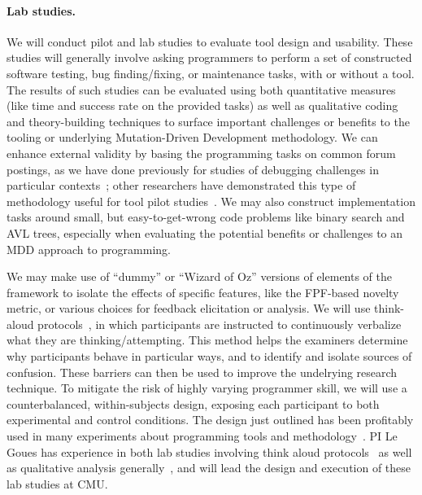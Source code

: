 \paragraph{Lab studies.}  
We will conduct pilot and lab studies to evaluate tool design
and usability. 
These studies will generally involve asking programmers to perform a set of
constructed software testing, bug finding/fixing, or maintenance tasks, with or
without a tool.  The results of such studies can be evaluated using both
quantitative measures (like time and success rate on the provided tasks) as well
as qualitative coding~\cite{something} and theory-building techniques to surface
important challenges or benefits to the tooling or underlying Mutation-Driven
Development methodology.  We can enhance external validity by basing the
programming tasks on common forum postings, as we have done previously for
studies of debugging challenges in particular
contexts~\cite{frameworkDebugging}; other researchers have demonstrated this
type of methodology useful for tool pilot studies~\cite{sunshineDocumentation}.
We may also construct implementation tasks around small, but easy-to-get-wrong
code problems like binary search and AVL trees, especially when evaluating the
potential benefits or challenges to an MDD approach to programming.  

We may make use of ``dummy'' or ``Wizard of Oz'' versions of elements of the
framework to isolate the effects of specific features, like the FPF-based
novelty metric, or various choices for feedback elicitation or analysis. 
We will use
think-aloud protocols~\cite{thinkaloud}, in which participants are instructed to
continuously verbalize what they are thinking/attempting. This method helps the
examiners determine why participants behave in particular ways, and to identify
and isolate sources of confusion.  These barriers can then be used to improve
the undelrying research technique.  To mitigate the risk of highly varying
programmer skill, we will use a counterbalanced, within-subjects design,
exposing each participant to both experimental and control conditions.  The
design just outlined has been profitably used in many
experiments about programming tools and
methodology~\cite{Endrikat2014,Stylos07}.  PI Le Goues has experience in both
lab studies involving think aloud protocols~\cite{frameworkDebugging} as well as
qualitative analysis generally~\cite{testingUnderReview}, and will lead the
design and execution of these lab studies at CMU.

